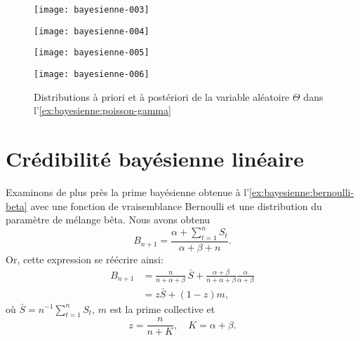 \begin{exemple}
  \begin{figure}[t]
    \begin{minipage}[t]{0.45\textwidth}
      \centering
\texttt{[image: bayesienne-003]}
    \end{minipage}
    \hfill
    \begin{minipage}[t]{0.45\textwidth}
      \centering
\texttt{[image: bayesienne-004]}
    \end{minipage}
    \begin{minipage}[t]{0.45\textwidth}
      \centering
\texttt{[image: bayesienne-005]}
    \end{minipage}
    \hfill
    \begin{minipage}[t]{0.45\textwidth}
      \centering
\texttt{[image: bayesienne-006]}
    \end{minipage}
    \caption{Distributions à priori et à postériori de la variable
      aléatoire $\Theta$ dans l'\autoref{ex:bayesienne:poisson-gamma}}
    \label{fig:bayesienne:poisson-gamma}
  \end{figure}
\end{exemple}


\section{Crédibilité bayésienne linéaire}
\label{sec:bayesienne:lineaire}

Examinons de plus près la prime bayésienne obtenue à
l'\autoref{ex:bayesienne:bernoulli-beta} avec une fonction de
vraisemblance Bernoulli et une distribution du paramètre de mélange
bêta. Nous avons obtenu
\begin{equation*}
  B_{n + 1} = \frac{\alpha + \sum_{t = 1}^n S_t}{\alpha + \beta + n}.
\end{equation*}
Or, cette expression se réécrire ainsi:
\begin{align*}
  B_{n + 1}
  &= \frac{n}{n + \alpha + \beta}\, \bar{S} +
  \frac{\alpha + \beta}{n + \alpha + \beta} \frac{\alpha}{\alpha + \beta} \\
  &= z \bar{S} + (1 - z) m,
\end{align*}
où $\bar{S} = n^{-1} \sum_{t = 1}^n S_t$, $m$ est la prime collective
et
\begin{equation*}
  z = \frac{n}{n + K}, \quad K = \alpha + \beta.
\end{equation*}

